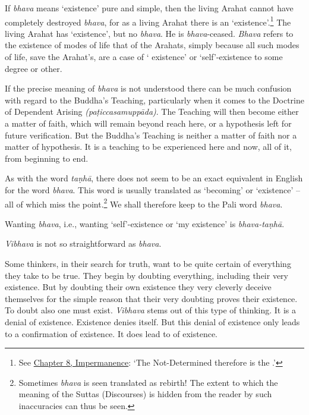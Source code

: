 If \emph{bhava} means `existence' pure and simple, then the living Arahat cannot have completely destroyed \emph{bhava}, for as a living Arahat there is an `existence'.\footnote{See \href{ch-08-impermanence.xml\#living-experience}{Chapter 8, Impermanence}: `The Not-Determined therefore is the .'} The living Arahat has `existence', but no \emph{bhava}. He is \emph{bhava}-ceased. \emph{Bhava} refers to the existence of  modes of life  that of the Arahats, simply because all such modes of life, save the Arahat's, are a case of ` existence' or `self'-existence to some degree or other.

If the precise meaning of \emph{bhava} is not understood there can be much confusion with regard to the Buddha's Teaching, particularly when it comes to the Doctrine of Dependent Arising \emph{(paṭiccasamuppāda)}. The Teaching will then become either a matter of faith, which will remain beyond reach here, or a hypothesis left for future verification. But the Buddha's Teaching is neither a matter of faith nor a matter of hypothesis. It is a teaching to be experienced here and now, all of it, from beginning to end.

As with the word \emph{taṇhā}, there does not seem to be an exact equivalent in English for the word \emph{bhava}. This word is usually translated as `becoming' or `existence' -- all of which miss the point.\footnote{Sometimes \emph{bhava} is seen translated as rebirth! The extent to which the meaning of the Suttas (Discourses) is hidden from the reader by such inaccuracies can thus be seen.} We shall therefore keep to the Pali word \emph{bhava}.

Wanting \emph{bhava}, i.e., wanting `self'-existence or `my existence' is \emph{bhava-taṇhā}.

\emph{Vibhava} is not so straightforward as \emph{bhava}.

Some thinkers, in their search for truth, want to be quite certain of everything they take to be true. They begin by doubting everything, including their very existence. But by doubting their own existence they very cleverly deceive themselves for the simple reason that their very doubting proves their existence. To doubt also one must exist. \emph{Vibhava} stems out of this type of thinking. It is a denial of existence. Existence denies itself. But this denial of existence only leads to a confirmation of existence. It does  lead to  of existence.

